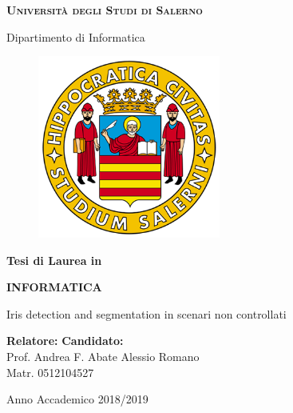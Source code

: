 \thispagestyle{empty}
\begin{center}
\fontsize{18px}{6mm}\selectfont \textsc{\textbf{Università degli Studi di Salerno}}
\end{center}

\begin{center}
\fontsize{18px}{6mm}\selectfont
Dipartimento di Informatica
\end{center}

\begin{figure}[h!]
	\centering
	\includegraphics[width=60mm]{img/logo_unisa}
\end{figure}

\begin{center}
\fontsize{16px}{3mm}\selectfont
\textbf{Tesi di Laurea in}
\end{center}
\begin{center}
\fontsize{16px}{6mm}\selectfont
\textbf{INFORMATICA}
\end{center}
\begin{center}
\fontsize{16px}{6mm}\selectfont
\vspace{10mm}
Iris detection and segmentation in scenari non controllati
\end{center}

\vspace{20mm}

\begin{flushleft}
\textbf{Relatore:} \hfill \textbf{Candidato:} \\
Prof. Andrea F. Abate \hfill Alessio Romano\\
\hfill Matr. 0512104527 \\
\end{flushleft}

\vfill

\begin{center}
Anno Accademico 2018/2019
\end{center}


